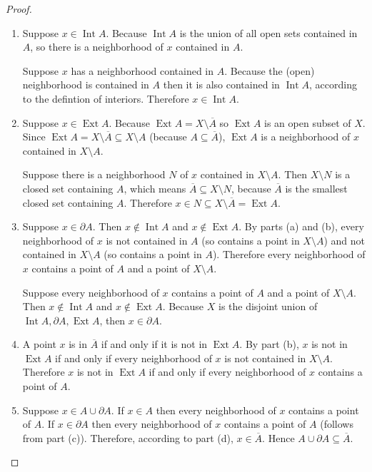 \begin{proof}
	\begin{enumerate}[label={(\alph*)}]
		\item Suppose $x\in \operatorname{Int} A$. Because $\operatorname{Int} A$ is the union of all open sets contained in $A$, so there is a neighborhood of $x$ contained in $A$.

		      Suppose $x$ has a neighborhood contained in $A$. Because the (open) neighborhood is contained in $A$ then it is also contained in $\operatorname{Int} A$, according to the defintion of interiors. Therefore $x\in \operatorname{Int} A$.
		\item Suppose $x\in \operatorname{Ext} A$. Because $\operatorname{Ext} A = X\setminus \overline{A}$ so $\operatorname{Ext} A$ is an open subset of $X$. Since $\operatorname{Ext} A = X\setminus \overline{A}\subseteq X\setminus A$ (because $A\subseteq \overline{A}$), $\operatorname{Ext} A$ is a neighborhood of $x$ contained in $X\setminus A$.

		      Suppose there is a neighborhood $N$ of $x$ contained in $X\setminus A$. Then $X\setminus N$ is a closed set containing $A$, which means $\overline{A}\subseteq X\setminus N$, because $\overline{A}$ is the smallest closed set containing $A$. Therefore $x\in N\subseteq X\setminus\overline{A} = \operatorname{Ext} A$.
		\item Suppose $x\in \partial A$. Then $x\notin\operatorname{Int} A$ and $x\notin\operatorname{Ext} A$. By parts (a) and (b), every neighborhood of $x$ is not contained in $A$ (so contains a point in $X\setminus A$) and not contained in $X\setminus A$ (so contains a point in $A$). Therefore every neighborhood of $x$ contains a point of $A$ and a point of $X\setminus A$.

		      Suppose every neighborhood of $x$ contains a point of $A$ and a point of $X\setminus A$. Then $x\notin \operatorname{Int} A$ and $x\notin \operatorname{Ext} A$. Because $X$ is the disjoint union of $\operatorname{Int}A, \partial A, \operatorname{Ext}A$, then $x\in\partial A$.
		\item A point $x$ is in $\overline{A}$ if and only if it is not in $\operatorname{Ext} A$. By part (b), $x$ is not in $\operatorname{Ext} A$ if and only if every neighborhood of $x$ is not contained in $X\setminus A$. Therefore $x$ is not in $\operatorname{Ext} A$ if and only if every neighborhood of $x$ contains a point of $A$.

		\item Suppose $x\in A\cup\partial A$. If $x\in A$ then every neighborhood of $x$ contains a point of $A$. If $x\in \partial A$ then every neighborhood of $x$ contains a point of $A$ (follows from part (c)). Therefore, according to part (d), $x\in\overline{A}$. Hence $A\cup\partial A\subseteq \overline{A}$.


\end{enumerate}
\end{proof}
